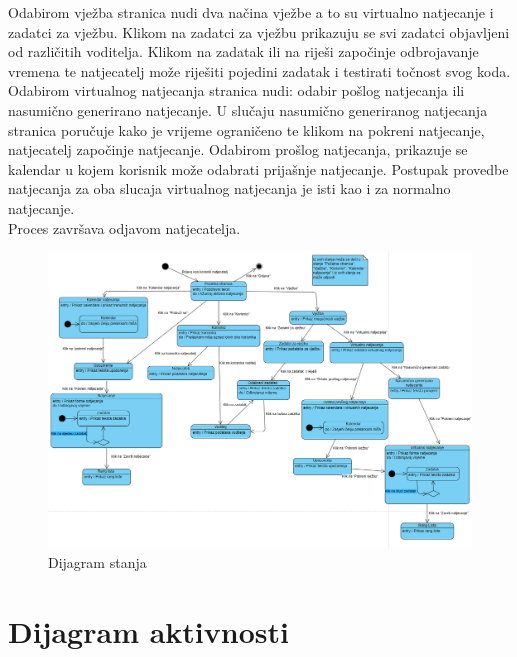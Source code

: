 {		Odabirom vježba stranica nudi dva načina vježbe a to su virtualno natjecanje i zadatci za vježbu. Klikom na zadatci za vježbu prikazuju se svi zadatci objavljeni od različitih voditelja. Klikom na zadatak ili na riješi započinje odbrojavanje vremena te natjecatelj može riješiti pojedini zadatak i testirati točnost svog koda. Odabirom virtualnog natjecanja stranica nudi: odabir pošlog natjecanja ili nasumično generirano natjecanje. U slučaju nasumično generiranog natjecanja stranica poručuje kako je vrijeme ograničeno te klikom na pokreni natjecanje, natjecatelj započinje natjecanje. Odabirom prošlog natjecanja, prikazuje se kalendar u kojem korisnik može odabrati prijašnje natjecanje. Postupak provedbe natjecanja za oba slucaja virtualnog natjecanja je isti kao i za normalno natjecanje.\\ 
		Proces završava odjavom natjecatelja. 	
		}\\
		\begin{figure}[H]
			\includegraphics[scale=0.4]{slike/dijagram stanja}
			\centering
			\caption{Dijagram stanja}
			\label{fig:dijagramstanja}
		\end{figure}	 
		
		\section{Dijagram aktivnosti}
		
